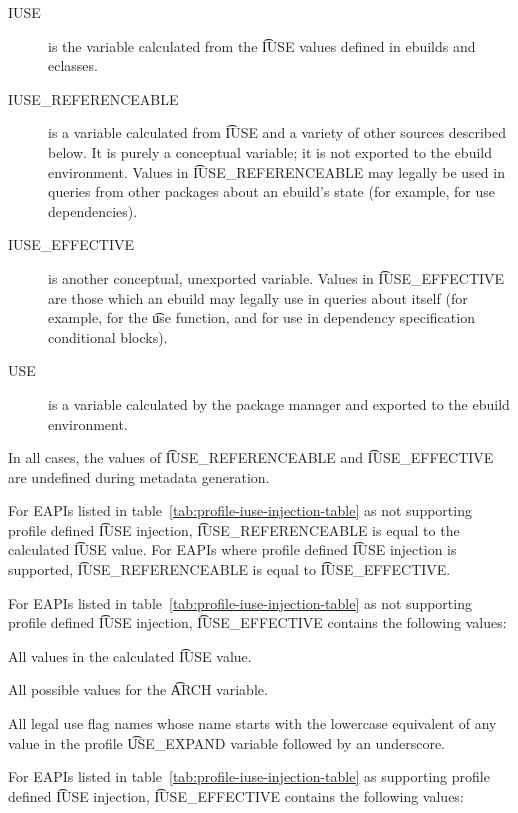 \begin{description}
\item[IUSE] is the variable calculated from the \t{IUSE} values defined in ebuilds and eclasses.
\item[IUSE\_REFERENCEABLE] is a variable calculated from \t{IUSE} and a variety of other sources
    described below. It is purely a conceptual variable; it is not exported to the ebuild
    environment. Values in \t{IUSE\_REFERENCEABLE} may legally be used in queries from other
    packages about an ebuild's state (for example, for use dependencies).
\item[IUSE\_EFFECTIVE] is another conceptual, unexported variable. Values in \t{IUSE\_EFFECTIVE} are
    those which an ebuild may legally use in queries about itself (for example, for the \t{use}
    function, and for use in dependency specification conditional blocks).
\item[USE] is a variable calculated by the package manager and exported to the ebuild environment.
\end{description}

In all cases, the values of \t{IUSE\_REFERENCEABLE} and \t{IUSE\_EFFECTIVE} are undefined during
metadata generation.

For EAPIs listed in table~\ref{tab:profile-iuse-injection-table} as not supporting profile defined
\t{IUSE} injection, \t{IUSE\_REFERENCEABLE} is equal to the calculated \t{IUSE} value. For EAPIs
where profile defined \t{IUSE} injection is supported, \t{IUSE\_REFERENCEABLE} is equal to
\t{IUSE\_EFFECTIVE}.

For EAPIs listed in table~\ref{tab:profile-iuse-injection-table} as not supporting profile defined
\t{IUSE} injection, \t{IUSE\_EFFECTIVE} contains the following values:

\begin{compactitem}
\item All values in the calculated \t{IUSE} value.
\item All possible values for the \t{ARCH} variable.
\item All legal use flag names whose name starts with the lowercase equivalent of any value in
    the profile \t{USE\_EXPAND} variable followed by an underscore.
\end{compactitem}

 For EAPIs listed in table~\ref{tab:profile-iuse-injection-table}
as supporting profile defined \t{IUSE} injection, \t{IUSE\_EFFECTIVE} contains the following values:

